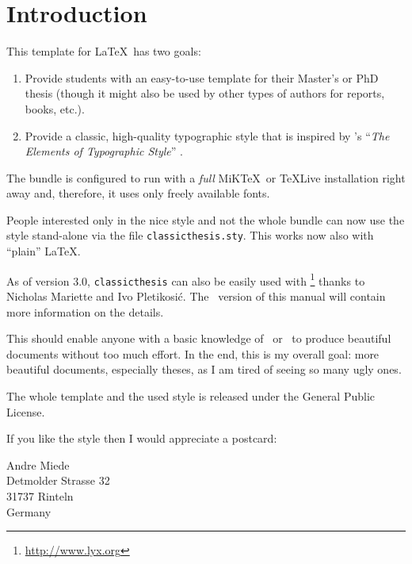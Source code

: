 
\chapter{Introduction} %

\label{ch:introduction} %


This template for \LaTeX\ has two goals:
\begin{enumerate}
\item Provide students with an easy-to-use template for their Master's or PhD thesis (though it might also be used by other types of authors for reports, books, etc.).
\item Provide a classic, high-quality typographic style that is inspired by \citeauthor{bringhurst:2002}'s ``\emph{The Elements of Typographic Style}'' \citep{bringhurst:2002}.

\end{enumerate}

The bundle is configured to run with a \emph{full} MiK\TeX\ or \TeX Live installation right away and, therefore, it uses only freely available fonts.

People interested only in the nice style and not the whole bundle can now use the style stand-alone via the file \texttt{classicthesis.sty}. This works now also with ``plain'' \LaTeX.

As of version 3.0, \texttt{classicthesis} can also be easily used with \mLyX\footnote{\url{http://www.lyx.org}} thanks to Nicholas Mariette and Ivo Pletikosi\'c. The \mLyX\ version of this manual will contain more information on the details.

This should enable anyone with a basic knowledge of \LaTeXe\ or \mLyX\ to produce beautiful documents without too much effort. In the end, this is my overall goal: more beautiful documents, especially theses, as I am tired of seeing so many ugly ones.

The whole template and the used style is released under the  General Public License. 

If you like the style then I would appreciate a postcard:
\begin{center}
Andre Miede \\
Detmolder Strasse 32 \\
31737 Rinteln \\
Germany
\end{center}


